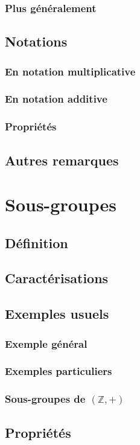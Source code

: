 \documentclass[12pt,a4paper,french]{book}
\begin{document}
			\subsubsection{Plus généralement}
		\subsection{Notations}
			\subsubsection{En notation multiplicative}
			\subsubsection{En notation additive}
			\subsubsection{Propriétés}
		\subsection{Autres remarques}
	\section{Sous-groupes}
		\subsection{Définition}
		\subsection{Caractérisations}
		\subsection{Exemples usuels}
			\subsubsection{Exemple général}
			\subsubsection{Exemples particuliers}
			\subsubsection{Sous-groupes de $(\mathbb{Z},+)$}
		\subsection{Propriétés}
\end{document}
